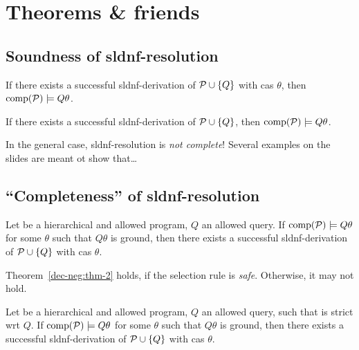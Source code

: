 \section{Theorems \& friends}

\subsection{Soundness of \gls{sldnf}-resolution}

\begin{thm}
    \label{dec-neg:thm-1}
    If there exists a successful \gls{sldnf}-derivation of \(\mathcal{P} \cup \lbrace Q \rbrace\) with \gls{cas} \(\theta\), then \(\operatorname{comp}(\mathcal{P}) \models Q\theta\).
\end{thm}

\begin{cor}
    If there exists a successful \gls{sldnf}-derivation of \(\mathcal{P} \cup \lbrace Q \rbrace\), then \(\operatorname{comp}(\mathcal{P}) \models Q\theta\).
\end{cor}

\begin{rem}
    In the general case, \gls{sldnf}-resolution is \emph{not complete}!
    Several examples on the slides are meant ot show that\ldots
\end{rem}

\subsection{``Completeness'' of \gls{sldnf}-resolution}

\begin{thm}
    \label{dec-neg:thm-2}
    Let \prog be a hierarchical and allowed program, \(Q\) an allowed query.
    If \(\operatorname{comp}(\mathcal{P}) \models Q\theta\) for some \(\theta\) such that \(Q\theta\) is ground, then there exists  a successful \gls{sldnf}-derivation of \(\mathcal{P} \cup \lbrace Q \rbrace\) with \gls{cas} \(\theta\).
\end{thm}

\begin{rem}
    Theorem~\ref{dec-neg:thm-2} holds, if the selection rule is \emph{safe}. Otherwise, it may not hold.
\end{rem}

\begin{thm}
    \label{de-neg:thm-3}
    Let \prog be a hierarchical and allowed program, \(Q\) an allowed query, such that \prog is strict wrt \(Q\).
    If \(\operatorname{comp}(\mathcal{P}) \models Q\theta\) for some \(\theta\) such that \(Q\theta\) is ground, then there exists  a successful \gls{sldnf}-derivation of \(\mathcal{P} \cup \lbrace Q \rbrace\) with \gls{cas} \(\theta\).
\end{thm}

